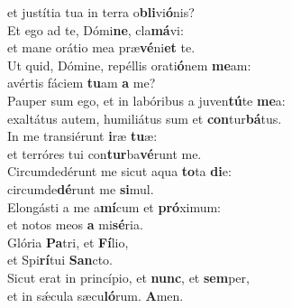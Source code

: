 \oddverse et justítia tua in terra o\textbf{bli}vi\textbf{ó}nis?\\
\evenverse Et ego ad te, Dómi\textbf{ne}, cla\textbf{má}vi:~\*\\
\evenverse et mane orátio mea præ\textbf{vé}ni\textbf{et} te.\\
\oddverse Ut quid, Dómine, repéllis orati\textbf{ó}nem \textbf{me}am:~\*\\
\oddverse avértis fáciem \textbf{tu}am \textbf{a} me?\\
\evenverse Pauper sum ego, et in labóribus a juven\textbf{tú}te \textbf{me}a:~\*\\
\evenverse exaltátus autem, humiliátus sum et \textbf{con}tur\textbf{bá}tus.\\
\oddverse In me transiérunt \textbf{i}ræ \textbf{tu}æ:~\*\\
\oddverse et terróres tui con\textbf{tur}ba\textbf{vé}runt me.\\
\evenverse Circumdedérunt me sicut aqua \textbf{to}ta \textbf{di}e:~\*\\
\evenverse circumde\textbf{dé}runt me \textbf{si}mul.\\
\oddverse Elongásti a me a\textbf{mí}cum et \textbf{pró}ximum:~\*\\
\oddverse et notos meos \textbf{a} mi\textbf{sé}ria.\\
\evenverse Glória \textbf{Pa}tri, et \textbf{Fí}lio,~\*\\
\evenverse et Spi\textbf{rí}tui \textbf{San}cto.\\
\oddverse Sicut erat in princípio, et \textbf{nunc}, et \textbf{sem}per,~\*\\
\oddverse et in sǽcula sæcu\textbf{ló}rum. \textbf{A}men.\\

